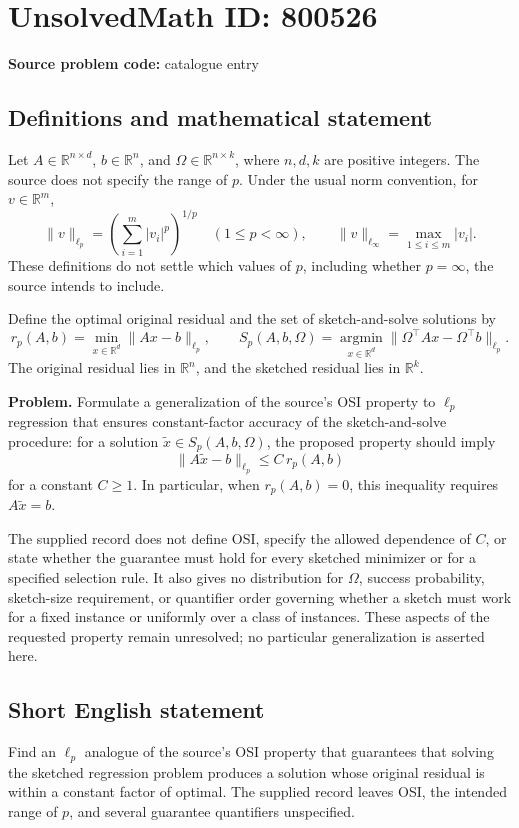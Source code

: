 \documentclass[11pt]{article}
\newcommand{\R}{\mathbb{R}}
\begin{document}
\section*{UnsolvedMath ID: 800526}
\textbf{Source problem code:} catalogue entry
\subsection{Definitions and mathematical statement}
Let \(A\in\R^{n\times d}\), \(b\in\R^n\), and \(\Omega\in\R^{n\times k}\), where \(n,d,k\) are positive integers. The source does not specify the range of \(p\). Under the usual norm convention, for \(v\in\R^m\),
\[
\|v\|_{\ell_p}=\left(\sum_{i=1}^m |v_i|^p\right)^{1/p}\quad(1\le p<\infty),
\qquad
\|v\|_{\ell_\infty}=\max_{1\le i\le m}|v_i|.
\]
These definitions do not settle which values of \(p\), including whether \(p=\infty\), the source intends to include.

Define the optimal original residual and the set of sketch-and-solve solutions by
\[
r_p(A,b)=\min_{x\in\R^d}\|Ax-b\|_{\ell_p},
\qquad
S_p(A,b,\Omega)=\operatorname*{argmin}_{x\in\R^d}
\|\Omega^\top Ax-\Omega^\top b\|_{\ell_p}.
\]
The original residual lies in \(\R^n\), and the sketched residual lies in \(\R^k\).

\textbf{Problem.} Formulate a generalization of the source's OSI property to \(\ell_p\) regression that ensures constant-factor accuracy of the sketch-and-solve procedure: for a solution \(\tilde x\in S_p(A,b,\Omega)\), the proposed property should imply
\[
\|A\tilde x-b\|_{\ell_p}\le C\,r_p(A,b)
\]
for a constant \(C\ge1\). In particular, when \(r_p(A,b)=0\), this inequality requires \(A\tilde x=b\).

The supplied record does not define OSI, specify the allowed dependence of \(C\), or state whether the guarantee must hold for every sketched minimizer or for a specified selection rule. It also gives no distribution for \(\Omega\), success probability, sketch-size requirement, or quantifier order governing whether a sketch must work for a fixed instance or uniformly over a class of instances. These aspects of the requested property remain unresolved; no particular generalization is asserted here.
\subsection{Short English statement}
Find an \(\ell_p\) analogue of the source's OSI property that guarantees that solving the sketched regression problem produces a solution whose original residual is within a constant factor of optimal. The supplied record leaves OSI, the intended range of \(p\), and several guarantee quantifiers unspecified.
\end{document}
